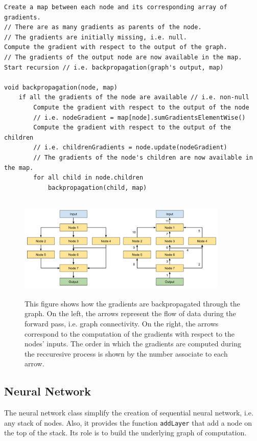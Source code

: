 \documentclass[11pt]{report}
\begin{document}
\begin{verbatim}
Create a map between each node and its corresponding array of gradients.
// There are as many gradients as parents of the node.
// The gradients are initially missing, i.e. null.
Compute the gradient with respect to the output of the graph.
// The gradients of the output node are now available in the map.
Start recursion // i.e. backpropagation(graph's output, map)

void backpropagation(node, map)
    if all the gradients of the node are available // i.e. non-null
        Compute the gradient with respect to the output of the node
        // i.e. nodeGradient = map[node].sumGradientsElementWise()
        Compute the gradient with respect to the output of the children
        // i.e. childrenGradients = node.update(nodeGradient)
        // The gradients of the node's children are now available in the map.
        for all child in node.children
            backpropagation(child, map)
\end{verbatim}

\begin{figure}[h]
\centering
\includegraphics[width=10cm, height=5cm]{graph_bp}
\caption[Backpropagation of the gradients in a graph of computation]{This figure shows how the gradients are backpropagated through the graph. On the left, the arrows represent the flow of data during the forward pass, i.e. graph connectivity. On the right, the arrows correspond to the computation of the gradients with respect to the nodes' inputs. The order in which the gradients are computed during the reccuresive process is shown by the number associate to each arrow.}
\end{figure}

\subsection{Neural Network}

The neural network class simplify the creation of sequential neural network, i.e. any stack of nodes. Also, it provides the function \texttt{addLayer} that add a node on the top of the stack. Its role is to build the underlying graph of computation.
\end{document}
